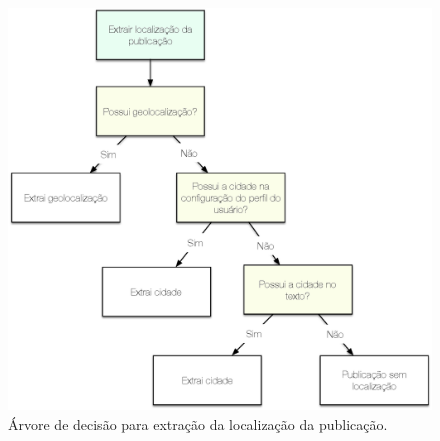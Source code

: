 \begin{figure}[htpb]
  \begin{center}
  \includegraphics[width=1.0\textwidth]{figuras/extracao-localizacao.eps}
  \caption{Árvore de decisão para extração da localização da publicação.}
  \end{center}
\end{figure}